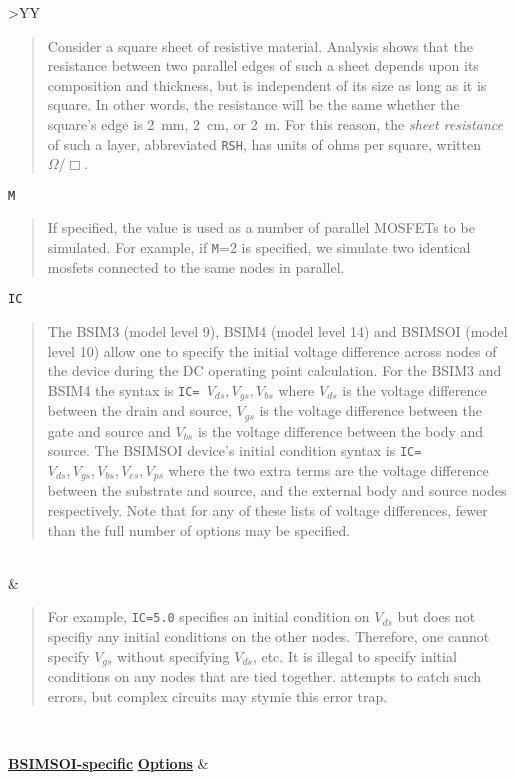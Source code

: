 \begin{longtable}[Hh]{>{\setlength{\hsize}{.4\hsize}}YY}
\begin{quote}
  Consider a square sheet of resistive material. Analysis shows that the
  resistance between two parallel edges of such a sheet depends upon its
  composition and thickness, but is independent of its size as long as it is
  square. In other words, the resistance will be the same whether the square's
  edge is 2~mm, 2~cm, or 2~m. For this reason, the \emph{sheet resistance} of
  such a layer, abbreviated \texttt{RSH}, has units of ohms per square,
  written $\mathsf{\Omega}/\Box$.
\end{quote}
\texttt{M}
\begin{quote}
  If specified, the value is used as a number of parallel MOSFETs to
  be simulated.  For example, if \texttt{M}=2 is specified, we
  simulate two identical mosfets connected to the same nodes in
  parallel.
\end{quote}
\texttt{IC}
\begin{quote}
  The BSIM3 (model level 9), BSIM4 (model level 14) and BSIMSOI (model level 
  10) allow one to specify the initial voltage difference across nodes of the 
  device during the DC operating point calculation.  For the BSIM3 and BSIM4
  the syntax is \texttt{IC= $V_{ds}, V_{gs}, V_{bs}$} where $V_{ds}$ is the 
  voltage difference between the drain and source, $V_{gs}$ is the voltage 
  difference between the gate and source and $V_{bs}$ is the voltage difference 
  between the body and source.   The BSIMSOI device's initial condition syntax 
  is \texttt{IC= $V_{ds}, V_{gs}, V_{bs}, V_{es}, V_{ps}$} where the two extra 
  terms are the voltage difference between the substrate and source, and the 
  external body and source nodes respectively.  Note that for any of these 
  lists of voltage differences, fewer than the full number of options may be 
  specified.
\end{quote}

\\ 
& 
\begin{quote} 
  For example, \texttt{IC=5.0} specifies an initial 
  condition on $V_{ds}$ but does not specifiy any initial conditions on the other
  nodes.  Therefore, one cannot specify $V_{gs}$ without specifying $V_{ds}$, etc.  
  It is illegal to specify initial conditions on any nodes that are tied together.
  \Xyce{} attempts to catch such errors, but complex circuits may stymie this
  error trap. 
\end{quote} 

\\ \hline

\underline{\bf BSIMSOI-specific} \underline{\bf Options} &


\end{longtable}
